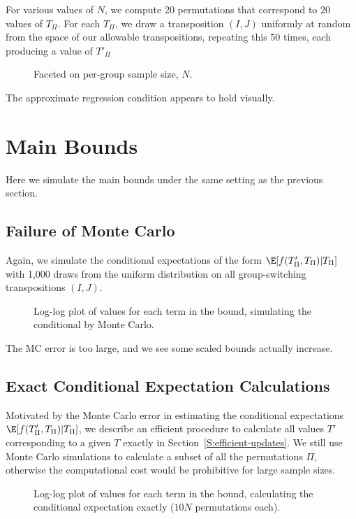 For various values of $N$, we compute 20 permutations that correspond to 20 values of $T_{\Pi}$.
For each $T_{\Pi}$, we draw a transposition $(I, J)$ uniformly at random from the space of our
allowable transpositions, repeating this 50 times, each producing a value of $T'_{\Pi}$
\begin{figure}[!ht]
  \centering
  \resizebox{12.0cm}{!}{}
  \caption{Faceted on per-group sample size, $N$.}
\end{figure}

The approximate regression condition appears to hold visually.
\clearpage

\section{Main Bounds}
Here we simulate the main bounds under the same setting as the previous section.
\subsection{Failure of Monte Carlo}
Again, we simulate the conditional expectations of the form $\E[f(T'_{\Pi}, T_{\Pi}) | T_{\Pi}]$
with 1,000 draws from the uniform distribution on all group-switching transpositions $(I, J)$.

\begin{figure}[!ht]
  \centering
  
  \caption{Log-log plot of values for each term in the bound,
    simulating the conditional by Monte Carlo.}
\end{figure}
The MC error is too large, and we see some scaled bounds actually increase.
\clearpage

\subsection{Exact Conditional Expectation Calculations}
Motivated by the Monte Carlo error in estimating the conditional expectations
$\E[f(T'_{\Pi}, T_{\Pi}) | T_{\Pi}]$, we describe an efficient procedure to
calculate all values $T'$ corresponding to a given $T$ exactly in Section~\ref{S:efficient-updates}.
We still use Monte Carlo simulations to calculate a subset of all the permutations $\Pi$, otherwise
the computational cost would be prohibitive for large sample sizes.
\begin{figure}[!ht]
  \centering
  
  \caption{Log-log plot of values for each term in the bound, calculating the conditional
    expectation exactly ($10N$ permutations each).}
\end{figure}

